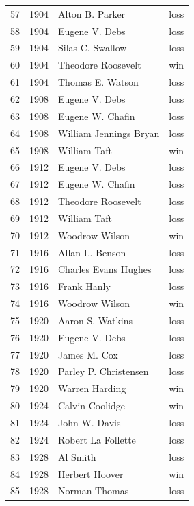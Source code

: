 \documentclass[
  letterpaper,
  DIV=11,
  numbers=noendperiod]{scrreprt}
\begin{document}
\begin{tabular}{lrll}
57  &  1904 &         Alton B. Parker &   loss \\
58  &  1904 &          Eugene V. Debs &   loss \\
59  &  1904 &        Silas C. Swallow &   loss \\
60  &  1904 &      Theodore Roosevelt &    win \\
61  &  1904 &        Thomas E. Watson &   loss \\
62  &  1908 &          Eugene V. Debs &   loss \\
63  &  1908 &        Eugene W. Chafin &   loss \\
64  &  1908 &  William Jennings Bryan &   loss \\
65  &  1908 &            William Taft &    win \\
66  &  1912 &          Eugene V. Debs &   loss \\
67  &  1912 &        Eugene W. Chafin &   loss \\
68  &  1912 &      Theodore Roosevelt &   loss \\
69  &  1912 &            William Taft &   loss \\
70  &  1912 &          Woodrow Wilson &    win \\
71  &  1916 &         Allan L. Benson &   loss \\
72  &  1916 &    Charles Evans Hughes &   loss \\
73  &  1916 &             Frank Hanly &   loss \\
74  &  1916 &          Woodrow Wilson &    win \\
75  &  1920 &        Aaron S. Watkins &   loss \\
76  &  1920 &          Eugene V. Debs &   loss \\
77  &  1920 &            James M. Cox &   loss \\
78  &  1920 &   Parley P. Christensen &   loss \\
79  &  1920 &          Warren Harding &    win \\
80  &  1924 &         Calvin Coolidge &    win \\
81  &  1924 &           John W. Davis &   loss \\
82  &  1924 &      Robert La Follette &   loss \\
83  &  1928 &                Al Smith &   loss \\
84  &  1928 &          Herbert Hoover &    win \\
85  &  1928 &           Norman Thomas &   loss \\

\end{tabular}
\end{document}
